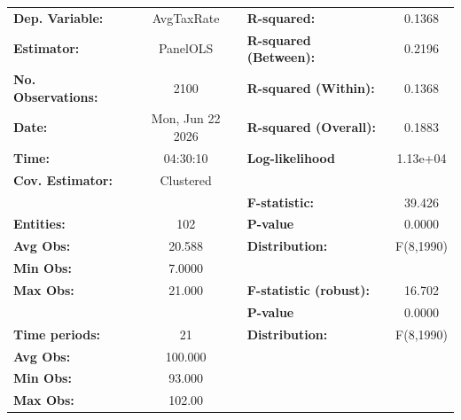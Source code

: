 \begin{center}
\begin{tabular}{lclc}
\toprule
\textbf{Dep. Variable:}                       &     AvgTaxRate     & \textbf{  R-squared:         }   &      0.1368      \\
\textbf{Estimator:}                           &      PanelOLS      & \textbf{  R-squared (Between):}  &      0.2196      \\
\textbf{No. Observations:}                    &        2100        & \textbf{  R-squared (Within):}   &      0.1368      \\
\textbf{Date:}                                &  Mon, Jun 22 2026  & \textbf{  R-squared (Overall):}  &      0.1883      \\
\textbf{Time:}                                &      04:30:10      & \textbf{  Log-likelihood     }   &     1.13e+04     \\
\textbf{Cov. Estimator:}                      &     Clustered      & \textbf{                     }   &                  \\
\textbf{}                                     &                    & \textbf{  F-statistic:       }   &      39.426      \\
\textbf{Entities:}                            &        102         & \textbf{  P-value            }   &      0.0000      \\
\textbf{Avg Obs:}                             &       20.588       & \textbf{  Distribution:      }   &    F(8,1990)     \\
\textbf{Min Obs:}                             &       7.0000       & \textbf{                     }   &                  \\
\textbf{Max Obs:}                             &       21.000       & \textbf{  F-statistic (robust):} &      16.702      \\
\textbf{}                                     &                    & \textbf{  P-value            }   &      0.0000      \\
\textbf{Time periods:}                        &         21         & \textbf{  Distribution:      }   &    F(8,1990)     \\
\textbf{Avg Obs:}                             &      100.000       & \textbf{                     }   &                  \\
\textbf{Min Obs:}                             &       93.000       & \textbf{                     }   &                  \\
\textbf{Max Obs:}                             &       102.00       & \textbf{                     }   &                  \\

\end{tabular}
\end{center}
